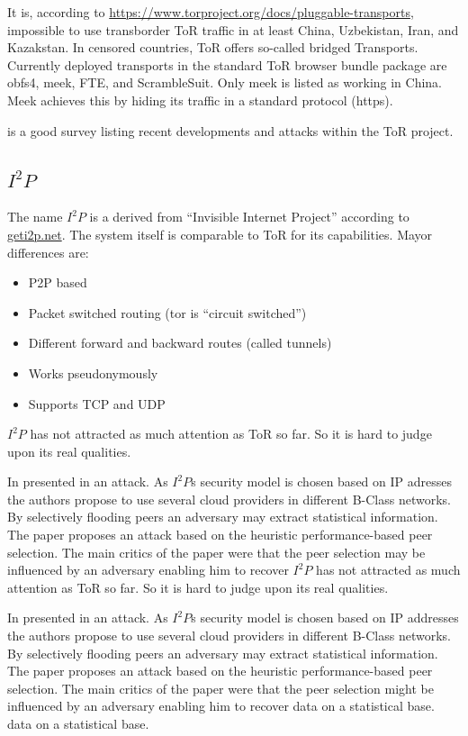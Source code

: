 It is, according to \url{https://www.torproject.org/docs/pluggable-transports}, impossible to use transborder ToR traffic in at least China, Uzbekistan, Iran, and Kazakstan. In censored countries, ToR offers so-called bridged Transports. Currently deployed transports in the standard ToR browser bundle package are obfs4, meek, FTE, and ScrambleSuit. Only meek is listed as working in China. Meek achieves this by hiding its traffic in a standard protocol (https).

\cite{saleh2018shedding} is a good survey listing recent developments and attacks within the ToR project.

\subsection{$I^2P$}
The name $I^2P$ is a derived from  ``Invisible Internet Project'' according to \href{https://geti2p.net/}{geti2p.net}. The system itself is comparable to ToR for its capabilities. Mayor differences are:
\begin{itemize}
	\item P2P based
	\item Packet switched routing (tor is ``circuit switched'')
	\item Different forward and backward routes (called tunnels)
	\item Works pseudonymously
	\item Supports TCP and UDP
\end{itemize}

$I^2P$ has not attracted as much attention as ToR so far. So it is hard to judge upon its real qualities.

In \citeyear{pets2011-i2p} \citeauthor{pets2011-i2p} presented in \cite{pets2011-i2p} an attack. As $I^2P$s security model is chosen based on IP adresses the authors propose to use several cloud providers in different B-Class networks. By selectively flooding peers an adversary may extract statistical information. The paper proposes an attack based on the heuristic performance-based peer selection. The main critics of the paper were that the peer selection may be influenced by an adversary enabling him to recover $I^2P$ has not attracted as much attention as ToR so far. So it is hard to judge upon its real qualities.

In \citeyear{pets2011-i2p} \citeauthor{pets2011-i2p} presented in \cite{pets2011-i2p} an attack. As $I^2P$s security model is chosen based on IP addresses the authors propose to use several cloud providers in different B-Class networks. By selectively flooding peers an adversary may extract statistical information. The paper proposes an attack based on the heuristic performance-based peer selection. The main critics of the paper were that the peer selection might be influenced by an adversary enabling him to recover data on a statistical base.
data on a statistical base.

